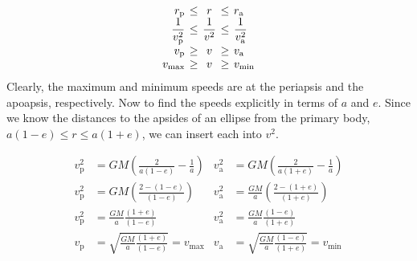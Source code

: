 \documentclass{article}
\begin{document}
{\begin{enumerate}
		\renewcommand{\arraystretch}{1.5}
			
		\[\setlength\arraycolsep{2pt}
			\begin{array}{rcccl} 
				r_\mathrm{p} & \leq & r & \leq & r_\mathrm{a} \\
				\dfrac{1}{v^2_\mathrm{p}} & \leq & \dfrac{1}{v^2} & \leq & \dfrac{1}{v^2_\mathrm{a}} \\
				v_\mathrm{p} & \geq & v & \geq & v_\mathrm{a} \\
				v_\mathrm{max} & \geq & v & \geq & v_\mathrm{min} \\
			\end{array}
		\]
		Clearly, the maximum and minimum speeds are at the periapsis and the apoapsis, respectively. Now to find the speeds explicitly in terms of $a$ and $e$. Since we know the distances to the apsides of an ellipse from the primary body, $a(1-e) \leq r \leq a(1+e)$, we can insert each into $v^2$.
				
		
		\begin{align*}
			v^2_\mathrm{p} &= GM\left( \frac{2}{a(1-e)} - \frac{1}{a} \right) & v^2_\mathrm{a} &= GM\left( \frac{2}{a(1+e)} - \frac{1}{a} \right) \\
			v^2_\mathrm{p} &= GM\left( \frac{2 - (1-e)}{(1-e)} \right) & v^2_\mathrm{a} &= \frac{GM}{a}\left( \frac{2 - (1+e)}{(1+e)} \right) \\
			v^2_\mathrm{p} &= \frac{GM}{a} \frac{(1+e)}{(1-e)} & v^2_\mathrm{a} &= \frac{GM}{a} \frac{(1-e)}{(1+e)} \\
			v_\mathrm{p} &= \sqrt{\frac{GM}{a} \frac{(1+e)}{(1-e)}} = v_\mathrm{max} & v_\mathrm{a} &= \sqrt{\frac{GM}{a} \frac{(1-e)}{(1+e)}} = v_\mathrm{min}
		\end{align*}
		
		
		
		
		
		

\end{enumerate}}
\end{document}
